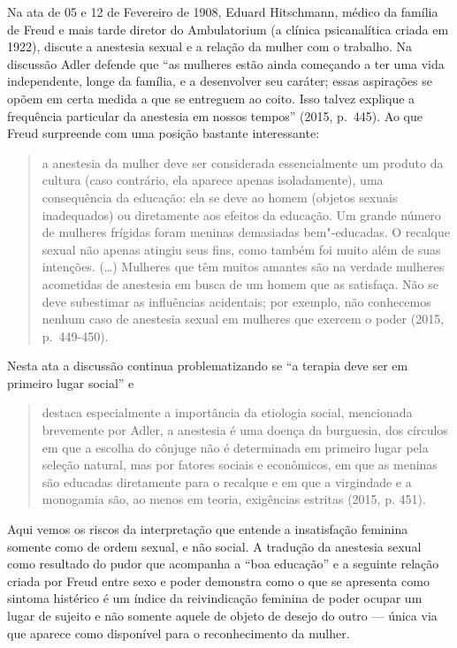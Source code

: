 Na ata de 05 e 12 de Fevereiro de 1908, Eduard Hitschmann, médico da
família de Freud e mais tarde diretor do Ambulatorium (a clínica
psicanalítica criada em 1922), discute a anestesia sexual e a relação da
mulher com o trabalho. Na discussão Adler defende que ``as mulheres
estão ainda começando a ter uma vida independente, longe da família, e a
desenvolver seu caráter; essas aspirações se opõem em certa medida a que
se entreguem ao coito. Isso talvez explique a frequência particular da
anestesia em nossos tempos'' (2015, p.~445). Ao que Freud surpreende com
uma posição bastante interessante:

\begin{quote}
a anestesia da mulher deve ser considerada essencialmente um produto da
cultura (caso contrário, ela aparece apenas isoladamente), uma
consequência da educação: ela se deve ao homem (objetos sexuais
inadequados) ou diretamente aos efeitos da educação. Um grande número de
mulheres frígidas foram meninas demasiadas bem"-educadas. O recalque
sexual não apenas atingiu seus fins, como também foi muito além de suas
intenções. (\ldots{}) Mulheres que têm muitos amantes são na verdade mulheres
acometidas de anestesia em busca de um homem que as satisfaça. Não se
deve subestimar as influências acidentais; por exemplo, não conhecemos
nenhum caso de anestesia sexual em mulheres que exercem o poder (2015, p.~449-450).
\end{quote}

Nesta ata a discussão continua problematizando se ``a terapia deve ser em
primeiro lugar social'' e

\begin{quote}
destaca especialmente a importância da etiologia social, mencionada
brevemente por Adler, a anestesia é uma doença da burguesia, dos
círculos em que a escolha do cônjuge não é determinada em primeiro lugar
pela seleção natural, mas por fatores sociais e econômicos, em que as
meninas são educadas diretamente para o recalque e em que a virgindade e
a monogamia são, ao menos em teoria, exigências estritas (2015, p. 451).
\end{quote}

Aqui vemos os riscos da interpretação que entende a insatisfação
feminina somente como de ordem sexual, e não social. A tradução da
anestesia sexual como resultado do pudor que acompanha a ``boa
educação'' e a seguinte relação criada por Freud entre sexo e poder
demonstra como o que se apresenta como sintoma histérico é um índice da
reivindicação feminina de poder ocupar um lugar de sujeito e não somente
aquele de objeto de desejo do outro --- única via que aparece como
disponível para o reconhecimento da mulher.


